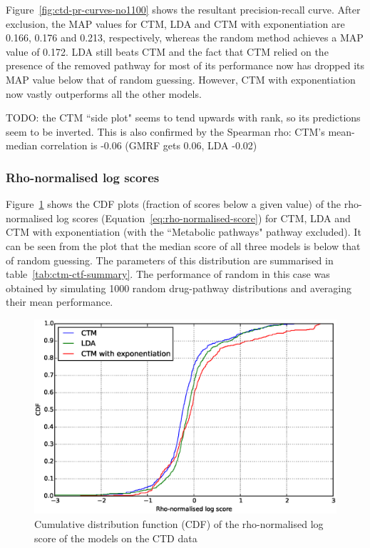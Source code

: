 \documentclass[12pt,a4paper,twoside,openright]{report}
\begin{document}
Figure~\ref{fig:ctd-pr-curves-no1100} shows the resultant precision-recall curve. After exclusion, the MAP values for CTM, LDA and CTM with exponentiation are 0.166, 0.176 and 0.213, respectively, whereas the random method achieves a MAP value of 0.172. LDA still beats CTM and the fact that CTM relied on the presence of the removed pathway for most of its performance now has dropped its MAP value below that of random guessing. However, CTM with exponentiation now vastly outperforms all the other models.

TODO: the CTM ``side plot" seems to tend upwards with rank, so its predictions seem to be inverted. This is also confirmed by the Spearman rho: CTM's mean-median correlation is -0.06 (GMRF gets 0.06, LDA -0.02)

\subsubsection{Rho-normalised log scores}
Figure~\ref{fig:ctd-rho-cdf} shows the CDF plots (fraction of scores below a given value) of the rho-normalised log scores (Equation~\ref{eq:rho-normalised-score}) for CTM, LDA and CTM with exponentiation (with the ``Metabolic pathways" pathway excluded). It can be seen from the plot that the median score of all three models is below that of random guessing. The parameters of this distribution are summarised in table~\ref{tab:ctm-ctf-summary}. The performance of random in this case was obtained by simulating 1000 random drug-pathway distributions and averaging their mean performance.

\begin{figure}[!htb]
\includegraphics[width=\textwidth]{ctd-rho-cdf.eps}
\caption{Cumulative distribution function (CDF) of the rho-normalised log score of the models on the CTD data}
\label{fig:ctd-rho-cdf}
\end{figure}
\end{document}
